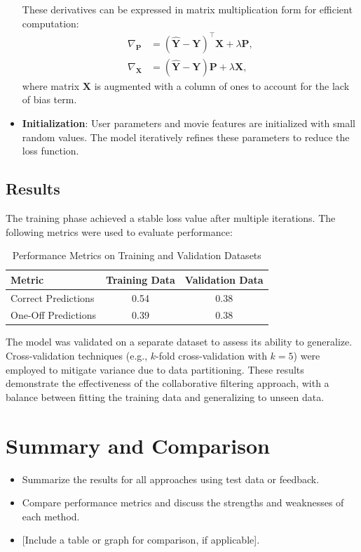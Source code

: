 \documentclass[a4paper,9pt]{article}
\begin{document}
\begin{itemize}
	      These derivatives can be expressed in matrix multiplication form for efficient computation:
	      \begin{align*}
		      \nabla_{\mathbf{P}} & = (\mathbf{\hat{Y}} - \mathbf{Y})^\top \mathbf{X} + \lambda \mathbf{P}, \\
		      \nabla_{\mathbf{X}} & = (\mathbf{\hat{Y}} - \mathbf{Y}) \mathbf{P} + \lambda \mathbf{X},
	      \end{align*}
	      where matrix $\mathbf{X}$ is augmented with a column of ones to account for the lack of bias term.
	\item \textbf{Initialization}:
	      User parameters and movie features are initialized with small random values. The model iteratively refines these parameters to reduce the loss function.
\end{itemize}

\subsection{Results}
The training phase achieved a stable loss value after multiple iterations.
The following metrics were used to evaluate performance:

\begin{table}[h]
	\centering
	\begin{tabular}{|l|c|c|}
		\hline
		\textbf{Metric}     & \textbf{Training Data} & \textbf{Validation Data} \\ \hline
		Correct Predictions & 0.54                   & 0.38                     \\ \hline
		One-Off Predictions & 0.39                   & 0.38                     \\ \hline
	\end{tabular}
	\caption{Performance Metrics on Training and Validation Datasets}
	\label{tab:predictions_metrics}
\end{table}

The model was validated on a separate dataset to assess its ability to generalize.
Cross-validation techniques (e.g., \(k\)-fold cross-validation with \(k=5\)) were employed to mitigate variance due to data partitioning.
These results demonstrate the effectiveness of the collaborative filtering approach, with a balance between
fitting the training data and generalizing to unseen data.

\clearpage
\section{Summary and Comparison}

\begin{itemize}
	\item Summarize the results for all approaches using test data or feedback.
	\item Compare performance metrics and discuss the strengths and weaknesses of each method.
	\item{} [Include a table or graph for comparison, if applicable].
\end{itemize}
\end{document}
